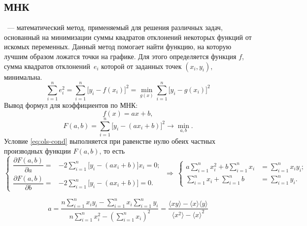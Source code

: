 \subsection{МНК}
~--- математический метод, применяемый для решения различных задач, основанный на минимизации суммы квадратов отклонений некоторых функций от искомых переменных. Данный метод помогает найти функцию, на которую лучшим образом ложатся точки на графике. Для этого определяется функция $f$, сумма квадратов отклонений~$e_i$ которой от заданных точек $\left( x_i, y_i \right)$, минимальна.
\begin{equation}
\sum\limits_{i=1}^n e_i^2 = \sum\limits_{i=1}^n \bigl[ y_i - f(x_i) \bigr]^2 = \min_{g(x)} \sum\limits_{i=1}^n \bigl[y_i - g(x_i) \bigr]^2
\label{eq:ols-cond}
\end{equation}
Вывод формул для коэффициентов  по МНК:
\begin{equation*}
f(x) = ax + b,
\end{equation*}
\begin{equation*}
F(a,b) = \sum\limits_{i=1}^n \bigl[y_i-(ax_i + b) \bigr]^2 \rightarrow \min_{a, b}.
\end{equation*}
Условие \eqref{eq:ols-cond} выполняется при равенстве нулю обеих частных производных функции $F(a, b)$, то есть
\begin{equation*}
\left\{ \begin{aligned}
\dfrac{\partial  F(a,b)}{\partial a} =& -2\sum\limits_{i=1}^n \bigl[ y_i-(ax_i + b) \bigr] x_i = 0;\\
\dfrac{\partial  F(a,b)}{\partial b} =& -2\sum\limits_{i=1}^n \bigl[ y_i-(ax_i + b) \bigr] = 0.
\end{aligned} \right. ~\Longrightarrow~
\left\{ \begin{aligned}
a \sum\limits_{i=1}^n x_i^2 + b \sum\limits_{i=1}^n x_i &= \sum\limits_{i=1}^n x_i y_i;\\
 \sum\limits_{i=1}^n x_i + \sum\limits_{i=1}^n b &= \sum\limits_{i=1}^n y_i.
\end{aligned} \right.
\end{equation*}

\begin{equation}
a = \dfrac{n\sum\limits_{i=1}^n x_i y_i - \sum\limits_{i=1}^n x_i \sum\limits_{i=1}^n y_i}{n \sum\limits_{i=1}^n x_i^2 - \left(\sum\limits_{i=1}^n x_i\right)^2} 
= \dfrac{\langle xy \rangle -\langle x\rangle \langle y \rangle}{\langle x^2 \rangle - \langle x \rangle^2}
\end{equation}

